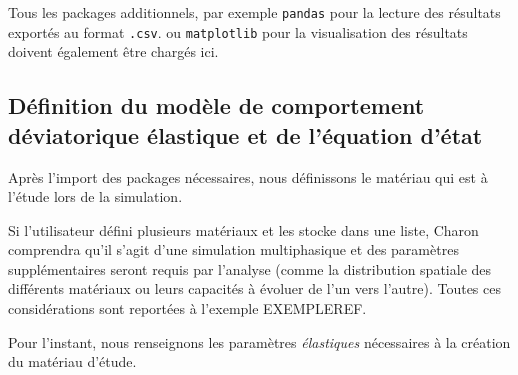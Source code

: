 \documentclass[10pt]{book}
\begin{document}
Tous les packages additionnels, par exemple \texttt{pandas} pour la lecture des résultats exportés au format \texttt{.csv}. ou \texttt{matplotlib} pour la visualisation des résultats doivent également être chargés ici.
\subsection{Définition du modèle de comportement déviatorique élastique et de l'équation d'état} 
Après l'import des packages nécessaires, nous définissons le matériau qui est à l'étude lors de la simulation. 

Si l'utilisateur défini plusieurs matériaux et les stocke dans une liste, Charon comprendra qu'il s'agit d'une simulation multiphasique et des paramètres supplémentaires seront requis par l'analyse (comme la distribution spatiale des différents matériaux ou leurs capacités à évoluer de l'un vers l'autre). Toutes ces considérations sont reportées à l'exemple EXEMPLEREF.

Pour l'instant, nous renseignons les paramètres \emph{élastiques} nécessaires à la création du matériau d'étude.
\end{document}
